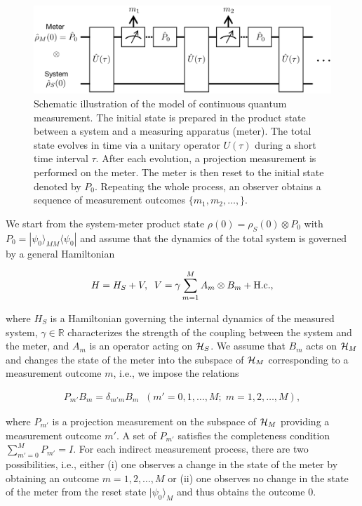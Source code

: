\documentclass{tADP2e}
\theoremstyle{plain}
\newcommand{\eqn}[1]{
\begin{eqnarray}
	#1
\end{eqnarray}
}
\theoremstyle{plain}
\theoremstyle{definition}
\begin{document}
\begin{figure}[t]
\begin{center}
\includegraphics[width=12cm]{./Figures/fig_4_indirect_meas.pdf}
\end{center}
\caption{Schematic illustration of the model of continuous quantum measurement. The initial state is prepared in the product state between a system and a measuring apparatus (meter). The total state evolves in time via a unitary operator $U(\tau)$ during a short time interval $\tau$. After each evolution, a projection measurement is performed on the meter. The meter  is then reset to the initial state denoted by $P_0$. Repeating the whole process, an observer obtains a sequence of measurement outcomes $\{m_1,m_2,\ldots,\}$.}
\label{fig:4indirectmeas}
\end{figure}

We start from the system-meter product state $ {\rho}(0)= {\rho}_{S}(0)\otimes {P}_{0}$ with $ {P}_{0}=|\psi_{0}\rangle_{MM}\langle\psi_{0}|$ and assume that the dynamics of the total system is governed by a general Hamiltonian
\eqn{\label{hamindirect}
 {H}= {H}_{S}+ {V},\;\; {V}=\gamma\sum_{m=1}^{M} {A}_{m}\otimes {B}_{m}+{\rm H.c.},
}
where $ {H}_{S}$ is a Hamiltonian governing the internal dynamics of the measured system, $\gamma\in{\mathbb R}$ characterizes the strength of the coupling between the system and the meter, and $ {A}_{m}$ is an operator acting on ${\cal H}_{S}$. We assume that $ {B}_{m}$ acts on  ${\cal H}_{M}$ and changes the state of the meter  into the subspace of ${\cal H}_{M}$ corresponding to a measurement outcome $m$, i.e., we impose the relations
\eqn{
 {P}_{m'} {B}_{m}=\delta_{m'm} {B}_{m}\;\; (m'=0,1,\ldots,M;\;m=1,2,\ldots,M),
}
where $ {P}_{m'}$ is a projection measurement on the subspace of ${\cal H}_{M}$ providing a measurement outcome $m'$. A set of $ {P}_{m'}$ satisfies the completeness condition $\sum_{m'=0}^{M} {P}_{m'}= {I}$.
For each indirect measurement process, there are two possibilities, i.e., either  (i) one observes  a change in the state of the meter by obtaining an outcome $m=1,2,\ldots,M$ or  (ii) one observes  no change in the state of the meter from the reset state $|\psi_{0}\rangle_{M}$ and thus obtains the outcome $0$. 
\end{document}
